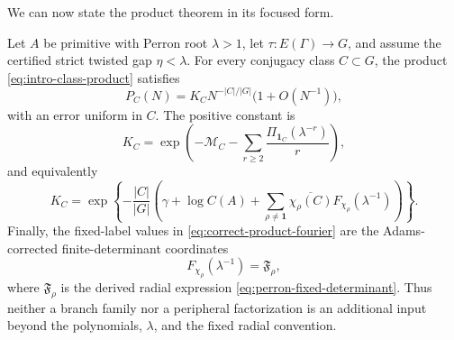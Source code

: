We can now state the product theorem in its focused form.

\begin{theorem}
\label{thm:correct-product}
Let \(A\) be primitive with Perron root \(\lambda>1\), let
\(\tau:E(\Gamma)\to G\), and assume the certified strict twisted gap
\(\eta<\lambda\).  For every conjugacy class \(C\subset G\), the product
\eqref{eq:intro-class-product} satisfies
\begin{equation}\label{eq:correct-product-asymptotic}
  P_C(N)=K_C N^{-|C|/|G|}\bigl(1+O(N^{-1})\bigr),
\end{equation}
with an error uniform in \(C\).  The positive constant is
\begin{equation}\label{eq:correct-product-orbit}
  K_C=\exp\!\left(
    -\mathcal M_C-
    \sum_{r\geq2}\frac{\Pi_{\mathbf1_C}(\lambda^{-r})}{r}
  \right),
\end{equation}
and equivalently
\begin{equation}\label{eq:correct-product-fourier}
  K_C=\exp\!\left\{-\frac{|C|}{|G|}
    \left(\gamma+\log C(A)+
      \sum_{\rho\neq\mathbf1}
       \overline{\chi_\rho(C)}F_{\chi_\rho}(\lambda^{-1})
    \right)\right\}.
\end{equation}
Finally, the fixed-label values in \eqref{eq:correct-product-fourier} are
the Adams-corrected finite-determinant coordinates
\begin{equation}\label{eq:correct-product-determinant-coordinate}
 F_{\chi_\rho}(\lambda^{-1})=\mathfrak F_\rho,
\end{equation}
where \(\mathfrak F_\rho\) is the derived radial expression
\eqref{eq:perron-fixed-determinant}.  Thus neither a branch family nor a
peripheral factorization is an additional input beyond the polynomials,
\(\lambda\), and the fixed radial convention.
\end{theorem}

